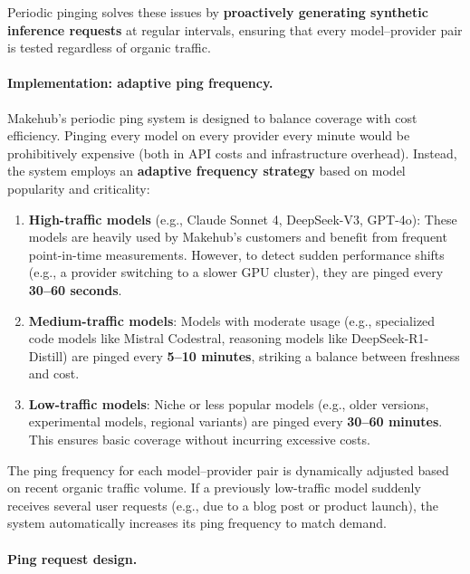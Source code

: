 \documentclass[english]{article}
\begin{document}
Periodic pinging solves these issues by \textbf{proactively generating synthetic inference requests} at regular intervals, ensuring that every model–provider pair is tested regardless of organic traffic.

\paragraph{Implementation: adaptive ping frequency.}

Makehub's periodic ping system is designed to balance coverage with cost efficiency. Pinging every model on every provider every minute would be prohibitively expensive (both in API costs and infrastructure overhead). Instead, the system employs an \textbf{adaptive frequency strategy} based on model popularity and criticality:

\begin{enumerate}
    \item \textbf{High-traffic models} (e.g., Claude Sonnet 4, DeepSeek-V3, GPT-4o): These models are heavily used by Makehub's customers and benefit from frequent point-in-time measurements. However, to detect sudden performance shifts (e.g., a provider switching to a slower GPU cluster), they are pinged every \textbf{30--60 seconds}.

    \item \textbf{Medium-traffic models}: Models with moderate usage (e.g., specialized code models like Mistral Codestral, reasoning models like DeepSeek-R1-Distill) are pinged every \textbf{5--10 minutes}, striking a balance between freshness and cost.

    \item \textbf{Low-traffic models}: Niche or less popular models (e.g., older versions, experimental models, regional variants) are pinged every \textbf{30--60 minutes}. This ensures basic coverage without incurring excessive costs.
\end{enumerate}

The ping frequency for each model–provider pair is dynamically adjusted based on recent organic traffic volume. If a previously low-traffic model suddenly receives several user requests (e.g., due to a blog post or product launch), the system automatically increases its ping frequency to match demand.

\paragraph{Ping request design.}
\end{document}
